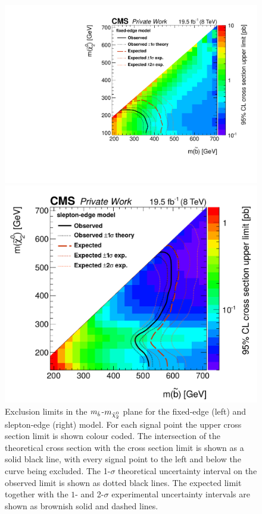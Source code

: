 \begin{figure}[htbp]
\centering
\begin{minipage}[t]{0.49\textwidth}
  \includegraphics[width=\textwidth]{plots/limits/Fixed_Edge_sbottom_neutralino2_Exclusion_witXsecLimit.pdf}
\end{minipage}
\begin{minipage}[t]{0.49\textwidth}
\includegraphics[width=\textwidth]{plots/limits/Fixed_Neutralino_sbottom_neutralino2_Exclusion_witXsecLimit.pdf}
\end{minipage}
\caption{Exclusion limits in the $m_{\tilde{b}}$-$m_{{\tilde{\chi}^0_2}}$ plane for the fixed-edge (left) and slepton-edge (right) model. For each signal point the upper cross section limit is shown colour coded. The intersection of the theoretical cross section with the cross section limit is shown as a solid black line, with every signal point to the left and below the curve being excluded. The 1-$\sigma$ theoretical uncertainty interval on the observed limit is shown as dotted black lines. The expected limit together with the $1$- and 2-$\sigma$ experimental uncertainty intervals are shown as brownish solid and dashed lines.}
\label{fig:limits}
\end{figure}